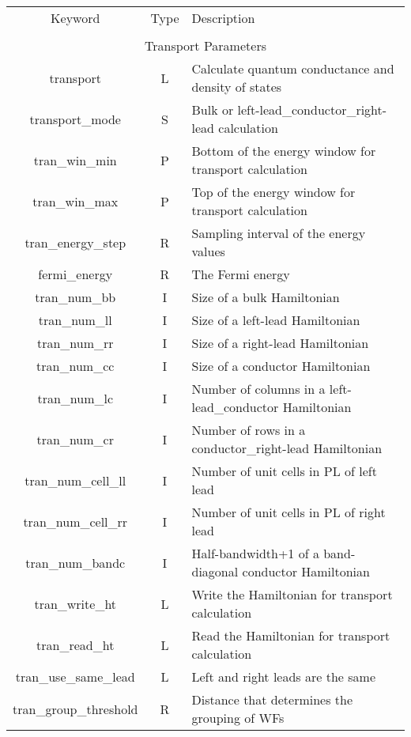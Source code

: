 \begin{table}
\begin{center}
\begin{tabular}{|c|c|p{6cm}|}
\hline
Keyword & Type & Description \\
        &      &             \\
\hline\hline
\multicolumn{3}{|c|}{Transport Parameters} \\
\hline
{\sc transport}   & L & Calculate quantum conductance and density of states \\
{\sc transport\_mode }  & S & Bulk or left-lead\_conductor\_right-lead calculation \\ 
{\sc tran\_win\_min } & P &  Bottom of the energy window for transport calculation\\  
{\sc tran\_win\_max } & P &  Top of the energy window for transport calculation\\ 
{\sc tran\_energy\_step } & R & Sampling interval of the energy values \\ 
{\sc fermi\_energy } & R & The Fermi energy \\
{\sc tran\_num\_bb } & I & Size of a bulk Hamiltonian \\  
{\sc tran\_num\_ll } & I & Size of a left-lead Hamiltonian \\
{\sc tran\_num\_rr } & I & Size of a right-lead Hamiltonian \\
{\sc tran\_num\_cc } & I & Size of a conductor Hamiltonian \\
{\sc tran\_num\_lc } & I & Number of columns in a left-lead\_conductor Hamiltonian \\
{\sc tran\_num\_cr } & I & Number of rows in a conductor\_right-lead Hamiltonian \\
{\sc tran\_num\_cell\_ll } & I & Number of unit cells in PL of left lead \\
{\sc tran\_num\_cell\_rr } & I & Number of unit cells in PL of right lead \\
{\sc tran\_num\_bandc } & I & Half-bandwidth+1 of a band-diagonal conductor Hamiltonian \\ 
{\sc tran\_write\_ht } & L & Write the Hamiltonian for transport calculation \\ 
{\sc tran\_read\_ht } & L & Read the Hamiltonian for transport calculation \\
{\sc tran\_use\_same\_lead } & L & Left and right leads are the same \\
{\sc tran\_group\_threshold } & R & Distance that determines the grouping of WFs \\

\end{tabular}
\end{center}
\end{table}
